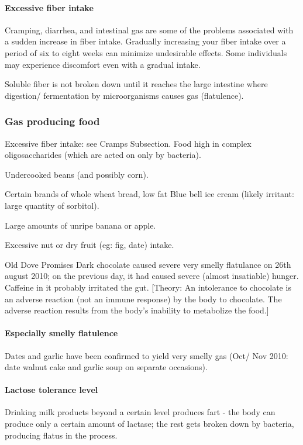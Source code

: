 \documentclass[oneside, article]{memoir}
\begin{document}
\paragraph*{Excessive fiber intake}
Cramping, diarrhea, and intestinal gas are some of the problems associated with a sudden increase in fiber intake. Gradually increasing your fiber intake over a period of six to eight weeks can minimize undesirable effects. Some individuals may experience discomfort even with a gradual intake.

Soluble fiber is not broken down until it reaches the large intestine where digestion/ fermentation by microorganisms causes gas (flatulence).

\subsubsection{Gas producing food}
Excessive fiber intake: see Cramps Subsection.  Food high in complex oligosaccharides (which are acted on only by bacteria).

Undercooked beans (and possibly corn). 

Certain brands of whole wheat bread, low fat Blue bell ice cream (likely irritant: large quantity of sorbitol).

Large amounts of unripe banana or apple.

Excessive nut or dry fruit (eg: fig, date) intake.

Old Dove Promises Dark chocolate caused severe very smelly flatulance on 26th august 2010; on the previous day, it had caused severe (almost insatiable) hunger. Caffeine in it probably irritated the gut. [Theory: An intolerance to chocolate is an adverse reaction (not an immune response) by the body to chocolate. The adverse reaction results from the body's inability to metabolize the food.]

\paragraph*{Especially smelly flatulence}
Dates and garlic have been confirmed to yield very smelly gas (Oct/ Nov 2010: date walnut cake and garlic soup on separate occasions).

\paragraph*{Lactose tolerance level}
Drinking milk products beyond a certain level produces fart - the body can produce only a certain amount of lactase; the rest gets broken down by bacteria, producing flatus in the process.
\end{document}
